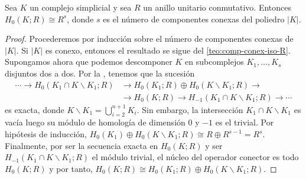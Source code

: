 \begin{corolario}
	Sea $K$ un complejo simplicial y sea $R$ un anillo unitario conmutativo.
	Entonces $H_{0}(K; R) \cong R^{s}$, donde $s$ es el número de componentes conexas
	del poliedro $|K|$.
\end{corolario}
\begin{proof}
	Procederemos por inducción sobre el número de componentes conexas de $|K|$. Si
	$|K|$ es conexo, entonces el resultado se sigue del \autoref{teo:comp-conex-iso-R}.
	Supongamos ahora que podemos descomponer $K$ en subcomplejos
	$K_{1}, \ldots, K_{s}$ disjuntos dos a dos. Por la ,
	tenemos que la sucesión
	\begin{align}
		\cdots \to H_{0}\left(K_{1}\cap K \backslash K_{1};R\right) & \to H_{0}(K_{1};R) \oplus H_{0}\left( K \backslash K_{1};R\right) \to           \\
		& \to H_{0}(K;R) \to H_{-1}\left(K_{1}\cap K \backslash K_{1};R\right) \to \cdots
	\end{align}
	es exacta, donde $K \backslash K_{1} = \bigcup_{i=2}^{n+1}K_{i}$. Sin embargo,
	la intersección $K_{1}\cap K \backslash K_{1}$ es vacía luego su módulo de
	homología de dimensión $0$ y $-1$ es el trivial. Por hipótesis de inducción,
	$H_{0}(K_{1}) \oplus H_{0}(K \backslash K_{1};R) \cong R \oplus R^{s-1}= R^{s}$.
	Finalmente, por ser la secuencia exacta en $H_{0}(K;R)$ y ser
	$H_{-1}\left(K_{1}\cap K \backslash K_{1};R\right)$ el módulo trivial, el núcleo
	del operador conector es todo $H_{0}(K;R)$ y por tanto,
	$H_{0}(K;R) \cong H_{0}(K_{1};R) \oplus H_{0}\left( K \backslash K_{1};R\right)$.
\end{proof}


